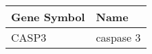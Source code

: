 \begin{tabular}{ll}
\toprule
Gene Symbol &      Name \\
\midrule
      CASP3 & caspase 3 \\
\bottomrule
\end{tabular}

